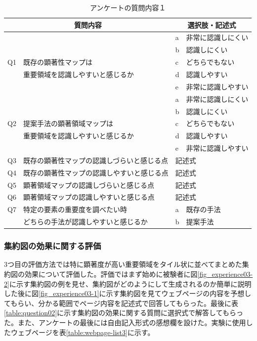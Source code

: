 \begin{table}[h]
    \caption{アンケートの質問内容１}
    \label{table:question01}
    \centering
    \begingroup
    \renewcommand{\arraystretch}{1} %
    \small
    \begin{tabular}{|l|l|l|l|}
        \hline
        \multicolumn{2}{|c|}{質問内容} & \multicolumn{2}{|c|}{選択肢・記述式} \\ \hline
        & & a & 非常に認識しにくい \\ \cline{3-4}
        & & b & 認識しにくい \\ \cline{3-4}
        Q1 & 既存の顕著性マップは & c & どちらでもない \\ \cline{3-4}
        & 重要領域を認識しやすいと感じるか & d & 認識しやすい \\ \cline{3-4}
        & & e & 非常に認識しやすい \\ \hline
        & & a & 非常に認識しにくい \\ \cline{3-4}
        & & b & 認識しにくい \\ \cline{3-4}
        Q2 & 提案手法の顕著領域マップは & c & どちらでもない \\ \cline{3-4}
        & 重要領域を認識しやすいと感じるか & d & 認識しやすい \\ \cline{3-4}
        & & e & 非常に認識しやすい \\ \hline
        Q3 & 既存の顕著性マップの認識しづらいと感じる点 & \multicolumn{2}{|l|}{記述式} \\ \hline
        Q4 & 既存の顕著性マップの認識しやすいと感じる点 & \multicolumn{2}{|l|}{記述式} \\ \hline
        Q5 & 顕著領域マップの認識しづらいと感じる点 & \multicolumn{2}{|l|}{記述式} \\ \hline
        Q6 & 顕著領域マップの認識しやすいと感じる点 & \multicolumn{2}{|l|}{記述式} \\ \hline
        Q7 & 特定の要素の重要度を調べたい時 & a & 既存の手法 \\ \cline{3-4}
        & どちらの手法が認識しやすいと感じるか  & b & 提案手法 \\ \hline
        \end{tabular}
        \endgroup
\end{table}


\subsubsection{集約図の効果に関する評価}
\par 3つ目の評価方法では特に顕著度が高い重要領域をタイル状に並べてまとめた集約図の効果について評価した。評価ではまず始めに被験者に図\ref{fig_experience03-2}に示す集約図の例を見せ、集約図がどのようにして生成されるのか簡単に説明した後に図\ref{fig_experience03-1}に示す集約図を見てウェブページの内容を予想してもらい、分かる範囲でページ内容を記述式で回答してもらった。最後に表\ref{table:question02}に示す集約図の効果に関する質問に選択式で解答してもらった。また、アンケートの最後には自由記入形式の感想欄を設けた。実験に使用したウェブページを表\ref{table:webpage-list3}に示す。

